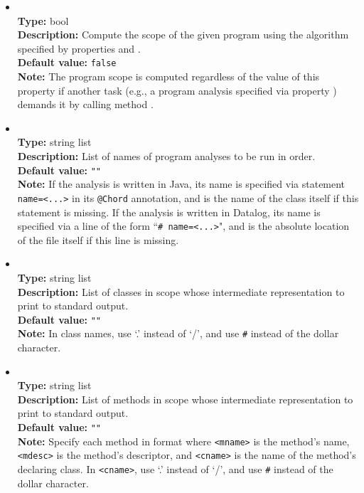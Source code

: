 \begin{itemize}
\item
{} \\
{\bf Type:} bool \\
{\bf Description:} Compute the scope of the given program using the algorithm specified by properties  and . \\
{\bf Default value:} {\tt false} \\
{\bf Note:} The program scope is computed regardless of the value of this property if another task (e.g., a program analysis specified via property ) demands it by calling method .

\item
{} \\
{\bf Type:} string list \\
{\bf Description:} List of names of program analyses to be run in order. \\
{\bf Default value:} {\tt ""} \\
{\bf Note:} If the analysis is written in Java, its name is specified via statement {\tt name=<...>} in its {\tt @Chord} annotation, and is the name of the class itself if this statement is missing.  If the analysis is written in Datalog, its name is specified via a line of the form ``{\tt \# name=<...>}", and is the absolute location of the file itself if this line is missing.

\item
{} \\
{\bf Type:} string list \\
{\bf Description:} List of classes in scope whose intermediate representation to print to standard output. \\
{\bf Default value:} {\tt ""} \\
{\bf Note:} In class names, use `.' instead of `/', and use {\tt \#} instead of the dollar character.

\item
{} \\
{\bf Type:} string list \\
{\bf Description:} List of methods in scope whose intermediate representation to print to standard output. \\
{\bf Default value:} {\tt ""} \\
{\bf Note:} Specify each method in format  where {\tt <mname>} is the method's name, {\tt <mdesc>} is the method's descriptor, and {\tt <cname>} is the name of the method's declaring class. In {\tt <cname>}, use `.' instead of `/', and use {\tt \#} instead of the dollar character.


\end{itemize}
